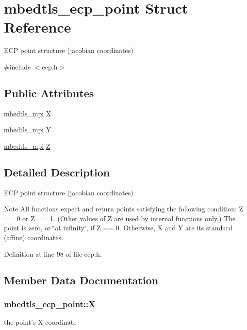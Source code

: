 \hypertarget{structmbedtls__ecp__point}{\section{mbedtls\-\_\-ecp\-\_\-point Struct Reference}
\label{structmbedtls__ecp__point}
}


E\-C\-P point structure (jacobian coordinates)  




{\ttfamily \#include $<$ecp.\-h$>$}

\subsection*{Public Attributes}
\begin{DoxyCompactItemize}
\item 
\hyperlink{structmbedtls__mpi}{mbedtls\-\_\-mpi} \hyperlink{structmbedtls__ecp__point_ac8ab6fd8f0f1173e6da5a4abcff1f0bf}{X}
\item 
\hyperlink{structmbedtls__mpi}{mbedtls\-\_\-mpi} \hyperlink{structmbedtls__ecp__point_af8fb56647185a0186c7a3c54eea30a4d}{Y}
\item 
\hyperlink{structmbedtls__mpi}{mbedtls\-\_\-mpi} \hyperlink{structmbedtls__ecp__point_a83c24649cb4c1ed8aae6449a29d094e5}{Z}
\end{DoxyCompactItemize}


\subsection{Detailed Description}
E\-C\-P point structure (jacobian coordinates) 

\begin{DoxyNote}{Note}
All functions expect and return points satisfying the following condition\-: Z == 0 or Z == 1. (Other values of Z are used by internal functions only.) The point is zero, or \char`\"{}at infinity\char`\"{}, if Z == 0. Otherwise, X and Y are its standard (affine) coordinates. 
\end{DoxyNote}


Definition at line 98 of file ecp.\-h.



\subsection{Member Data Documentation}
\hypertarget{structmbedtls__ecp__point_ac8ab6fd8f0f1173e6da5a4abcff1f0bf}{
\subsubsection[{X}]{ mbedtls\-\_\-ecp\-\_\-point\-::\-X}}\label{structmbedtls__ecp__point_ac8ab6fd8f0f1173e6da5a4abcff1f0bf}
the point's X coordinate 

